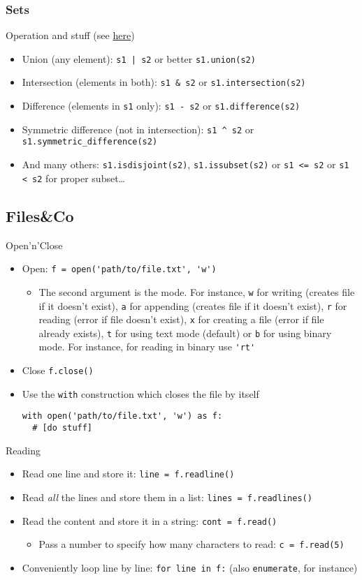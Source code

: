 \documentclass[a4paper,12pt,%
              final%
              ]{article}
\begin{document}
\subsubsection{Sets}
Operation and stuff (see \href{https://realpython.com/python-sets/}{here})
\begin{itemize}
  \item Union (any element): \verb!s1 | s2! or better \verb|s1.union(s2)|
  \item Intersection (elements in both): \verb|s1 & s2| or \verb|s1.intersection(s2)|
  \item Difference (elements in \verb|s1| only): \verb|s1 - s2| or \verb|s1.difference(s2)|
  \item Symmetric difference (not in intersection): \verb|s1 ^ s2| or \verb|s1.symmetric_difference(s2)|
  \item And many others: \verb|s1.isdisjoint(s2)|, \verb|s1.issubset(s2)| or \verb|s1 <= s2| or \verb|s1 < s2| for proper subset\ldots
\end{itemize}

\subsection{Files\&Co}
Open'n'Close
\begin{itemize}
  \item Open: \verb|f = open('path/to/file.txt', 'w')|
    \begin{itemize}
      \item The second argument is the mode. For instance, \verb|w| for writing (creates file if it doesn't exist), \verb|a| for appending (creates file if it doesn't exist), \verb|r| for reading (error if file doesn't exist), \verb|x| for creating a file (error if file already exists), \verb|t| for using text mode (default) or \verb|b| for using binary mode. For instance, for reading in binary use \verb|'rt'|
    \end{itemize}
  \item Close \verb|f.close()|
  \item Use the \verb|with| construction which closes the file by itself
\begin{verbatim}
with open('path/to/file.txt', 'w') as f:
  # [do stuff]
\end{verbatim}
\end{itemize}

Reading
\begin{itemize}
  \item Read one line and store it: \verb|line = f.readline()|
  \item Read \emph{all} the lines and store them in a list: \verb|lines = f.readlines()|
  \item Read the content and store it in a string: \verb|cont = f.read()|
    \begin{itemize}
      \item Pass a number to specify how many characters to read: \verb|c = f.read(5)|
    \end{itemize}
  \item Conveniently loop line by line: \verb|for line in f:| (also \verb|enumerate|, for instance)
\end{itemize}
\end{document}
